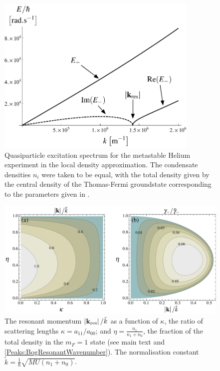 \begin{figure}[tbp]
    \centering
    \includegraphics[height=3in]{QuasiparticleSpectrum}
    \caption{Quasiparticle excitation spectrum for the metastable Helium experiment in the local density approximation. The condensate densities $n_i$ were taken to be equal, with the total density given by the central density of the Thomas-Fermi groundstate corresponding to the parameters given in . }
    \label{Peaks:QuasiparticleSpectrum}
\end{figure}


\begin{figure}[tbp]
    \centering
        \includegraphics[width=14cm]{ResonantMomentumGrowthRates}
    \caption{The resonant momentum $\left|\mathbf{k}_\text{res}\right|/\tilde{k}$ as a function of $\kappa$, the ratio of scattering lengths $\kappa = a_{11}/a_{00}$; and $\displaystyle \eta = \frac{n_1}{n_1+n_0}$, the fraction of the total density in the $m_F=1$ state (see main text and \eqref{Peaks:BogResonantWavenumber}). The normalisation constant $\displaystyle\tilde{k}=  \frac{1}{\hbar}\sqrt{MU(n_1 + n_0)}$. }
    \label{Peaks:ResonantMomentumGrowthRates}
\end{figure}



